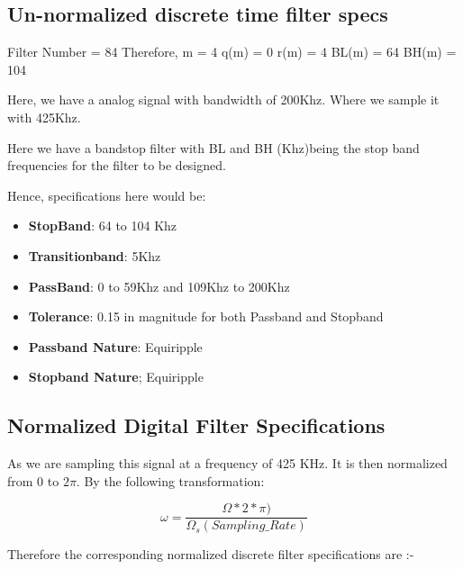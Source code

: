 \documentclass[12pt, letterpaper,]{article}
\begin{document}
\subsection{Un-normalized discrete time filter specs}

Filter Number = 84
Therefore, m = 4
q(m) = 0
r(m) = 4
BL(m) = 64
BH(m) = 104

Here, we have a analog signal with bandwidth of 200Khz. Where we sample it with 425Khz.

Here we have a bandstop filter with BL and BH (Khz)being the stop band frequencies for the filter to be designed. 

Hence, specifications here would be:
\begin{itemize}

\item \textbf{StopBand}: 64 to 104 Khz

\item \textbf{Transitionband}: 5Khz

\item \textbf{PassBand}: 0 to 59Khz and 109Khz to 200Khz

\item \textbf{Tolerance}: 0.15 in magnitude for both Passband and Stopband

\item \textbf{Passband Nature}: Equiripple

\item \textbf{Stopband Nature}; Equiripple

\end{itemize}

\subsection{Normalized Digital Filter Specifications}

As we are sampling this signal at a frequency of 425 KHz. It is then normalized from 0 to $2\pi$. By the following transformation:

\begin{equation}
    \omega = \frac{\Omega * 2 * \pi)}{\Omega_{s}(Sampling\_Rate)}
\end{equation}

Therefore the corresponding normalized discrete filter specifications are :-
\end{document}
